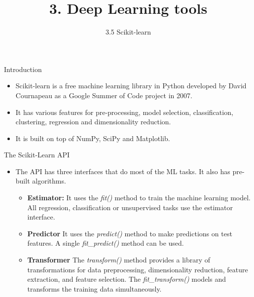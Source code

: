 \documentclass{beamer}
\title{3. Deep Learning tools}
\subtitle{3.5 Scikit-learn}
\begin{document}
\maketitle
\begin{frame}{Introduction}
   \begin{itemize}  
   \item Scikit-learn is a free machine learning library in Python developed  by David Cournapeau as a Google Summer of Code project in 2007.
   \item It has various features for pre-processing, model selection, classification, clustering, regression and dimensionality reduction. 
   \item It is built on top of NumPy, SciPy and Matplotlib. 
   \end{itemize}
\end{frame}


\begin{frame}[fragile]{The Scikit-Learn API}

\begin{itemize}
\item The API has three interfaces that do most of the ML tasks. It also has pre-built algorithms. 
 
\begin{itemize}
 \item[]\textbf{Estimator:}  It uses the \emph{fit()} method to train the machine learning model. All regression, classification or unsupervised tasks use the estimator interface.
 
 \item[]\textbf{Predictor} It uses
the \emph{predict()} method to make  predictions on test features. A single \emph{fit\_predict()} method can be used.
 
 \item[]\textbf{Transformer} The \emph{transform()} method provides a library of transformations for data preprocessing, dimensionality reduction, feature extraction, and feature selection. The \emph{fit\_transform()} models and transforms the training data simultaneously.
\end{itemize}
\end{itemize}
\end{frame}
\end{document}
